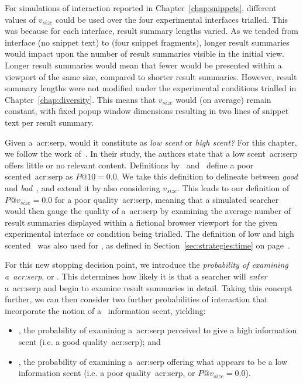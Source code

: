For simulations of interaction reported in Chapter~\ref{chap:snippets}, different values of $v_{size}$ could be used over the four experimental interfaces trialled. This was because for each interface, result summary lengths varied. As we tended from interface  (no snippet text) to  (four snippet fragments), longer result summaries would impact upon the number of result summaries visible in the initial view. Longer result summaries would mean that fewer would be presented within a viewport of the same size, compared to shorter result summaries. However, result summary lengths were not modified under the experimental conditions trialled in Chapter~\ref{chap:diversity}. This means that $v_{size}$ would (on average) remain constant, with fixed popup window dimensions resulting in two lines of snippet text per result summary.

 Given a~\gls{acr:serp}, would it constitute as \emph{low scent} or \emph{high scent?} For this chapter, we follow the work of~\cite{wu2014information_scent}. In their study, the authors state that a low scent~\gls{acr:serp} offers little or no relevant content. Definitions by~\cite{wu2014information_scent} and~\cite{hassan2013serp_abandonment} define a poor scented~\gls{acr:serp} as $P@10=0.0$. We take this definition to delineate between \emph{good} and \emph{bad}~, and extend it by also considering $v_{size}$. This leads to our definition of $P@v_{size}=0.0$ for a poor quality~\gls{acr:serp}, meaning that a simulated searcher would then gauge the quality of a~\gls{acr:serp} by examining the average number of result summaries displayed within a fictional browser viewport for the given experimental interface or condition being trialled. The definition of low and high scented~ was also used for , as defined in Section~\ref{sec:strategies:time} on page~\pageref{sec:strategies:time}.

 For this new stopping decision point, we introduce the \emph{probability of examining a~\gls{acr:serp}}, or . This determines how likely it is that a searcher will \emph{enter} a~\gls{acr:serp} and begin to examine result summaries in detail. Taking this concept further, we can then consider two further probabilities of interaction that incorporate the notion of a~ information scent, yielding:

\begin{itemize}
    \item{, the probability of examining a~\gls{acr:serp} perceived to give a high information scent (i.e. a good quality~\gls{acr:serp}); and}
    \item{, the probability of examining a~\gls{acr:serp} offering what appears to be a low information scent (i.e. a poor quality~\gls{acr:serp}, or $P@v_{size}=0.0$).}
\end{itemize}


